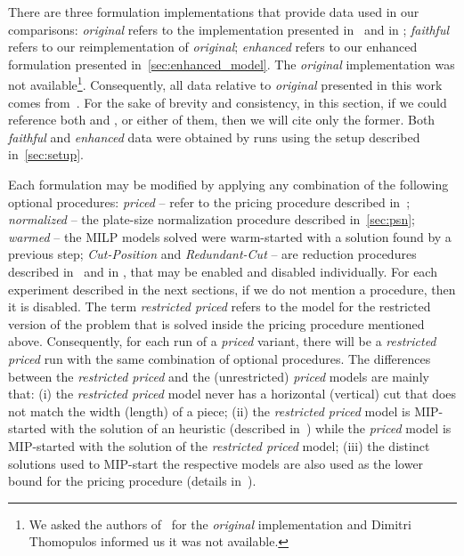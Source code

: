 \documentclass[ppgc,prop-tese,english,formais,babel]{iiufrgs}
\begin{document}
There are three formulation implementations that provide data used in our comparisons:
\emph{original} refers to the implementation presented in~\citet{furini:2016} and in \citet{dimitri_thesis};
\emph{faithful} refers to our reimplementation of \emph{original};
\emph{enhanced} refers to our enhanced formulation presented in~\cref{sec:enhanced_model}.
The \emph{original} implementation was not available\footnote{
	We asked the authors of~\citet{furini:2016} for the \emph{original} implementation and Dimitri Thomopulos informed us it was not available.
}.
Consequently, all data relative to \emph{original} presented in this work comes from~\citet{dimitri_thesis}.
For the sake of brevity and consistency, in this section, if we could reference both \citet{dimitri_thesis} and \citet{furini:2016}, or either of them, then we will cite only the former.
Both \emph{faithful} and \emph{enhanced} data were obtained by runs using the setup described in~\cref{sec:setup}.

Each formulation may be modified by applying any combination of the following optional procedures:
\emph{priced} -- refer to the pricing procedure described in~\citet{dimitri_thesis};
\emph{normalized} -- the plate-size normalization procedure described in~\cref{sec:psn};
\emph{warmed} -- the MILP models solved were warm-started with a solution found by a previous step;
\emph{Cut-Position} and \emph{Redundant-Cut} -- are reduction procedures described in~\citet{furini:2016} and in \citet{dimitri_thesis}, that may be enabled and disabled individually.
For each experiment described in the next sections, if we do not mention a procedure, then it is disabled.
The term \emph{restricted priced} refers to the model for the restricted version of the problem that is solved inside the pricing procedure mentioned above.
Consequently, for each run of a \emph{priced} variant, there will be a \emph{restricted priced} run with the same combination of optional procedures.
The differences between the \emph{restricted priced} and the (unrestricted) \emph{priced} models are mainly that:
(i) the \emph{restricted priced} model never has a horizontal (vertical) cut that does not match the width (length) of a piece;
(ii) the \emph{restricted priced} model is MIP-started with the solution of an heuristic (described in~\citet{dimitri_thesis}) while the \emph{priced} model is MIP-started with the solution of the \emph{restricted priced} model;
(iii) the distinct solutions used to MIP-start the respective models are also used as the lower bound for the pricing procedure (details in~\citet{dimitri_thesis}).
\end{document}
